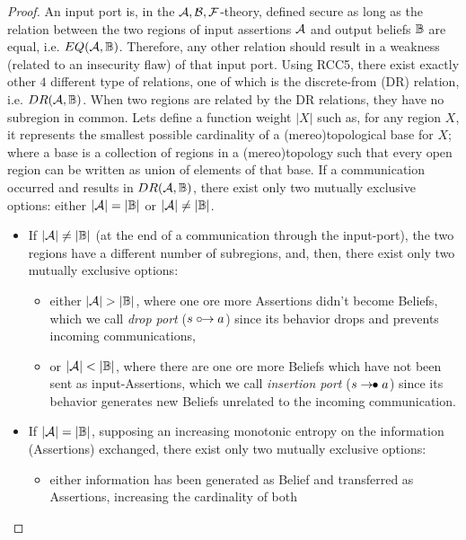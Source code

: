 \begin{proof}
An input port is, in the $\mathcal{A},\mathcal{B},\mathcal{F}$-theory, defined secure as long as the relation
	between the two regions of input assertions $\mathcal{A}$ and
	output beliefs $\mathbb{B}$ are equal, i.e.
	$EQ(\mathcal{A},\mathbb{B})$. Therefore, any other relation
	should result in a weakness (related to an insecurity flaw) of that
	input port.  Using RCC5, there exist exactly other $4$ different type
	of relations, one of which is the discrete-from (DR) relation, i.e.
	$DR(\mathcal{A},\mathbb{B})$. When two regions are related by
	the DR relations, they have no subregion in common. Lets
	define a function weight $|X|$ such as, for any region $X$, it
	represents the smallest possible cardinality of a (mereo)topological base for
	$X$; where a base is a collection of regions in a (mereo)topology such that
	every open region can be written as union of elements of that base.  If
	a communication occurred and results in
	$DR(\mathcal{A},\mathbb{B})$, there exist only two mutually
	exclusive options: either $|\mathcal{A}|=|\mathbb{B}|$ or
	$|\mathcal{A}|\neq|\mathbb{B}|$. 
	\begin{itemize}
		\item If $|\mathcal{A}|\neq|\mathbb{B}|$ (at the end of
			a communication through the input-port), the two
			regions have a different number of subregions, and,
			then, there exist only two mutually exclusive options: 
			\begin{itemize}
				\item either $|\assertionRegion|>|\beliefRegion|$, where one
					ore more Assertions didn't become Beliefs, which we
					call \emph{drop port} ($s\mathrel{\circ\!\!\rightarrow} a$) since its behavior drops and
					prevents incoming communications,
				\item or $|\assertionRegion|<|\beliefRegion|$, where there are
					one ore more Beliefs which have not been sent as
					input-Assertions, which we call \emph{insertion
					port} ($s\mathrel{\rightarrow\!\!\bullet} a$) since its behavior generates new Beliefs
					unrelated to the incoming communication. 
			\end{itemize}
		\item If $|\mathcal{A}|=|\mathbb{B}|$, supposing an increasing monotonic entropy on the information (Assertions) exchanged, 
				there exist only two mutually exclusive options: 
			\begin{itemize}
				\item either information has been generated as Belief and transferred as Assertions, increasing the cardinality of both

\end{itemize}
\end{itemize}
\end{proof}
